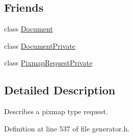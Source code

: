 \subsection*{Friends}
\begin{DoxyCompactItemize}
\item 
class \hyperlink{classOkular_1_1PixmapRequest_a883538034e58fc5c0de7d4e4cab3cef7}{Document}
\item 
class \hyperlink{classOkular_1_1PixmapRequest_ad60d3d11afe13773e689a27dbaba5d11}{Document\+Private}
\item 
class \hyperlink{classOkular_1_1PixmapRequest_ace334a3617b227e88359744b00f9085c}{Pixmap\+Request\+Private}
\end{DoxyCompactItemize}


\subsection{Detailed Description}
Describes a pixmap type request. 

Definition at line 537 of file generator.\+h.



